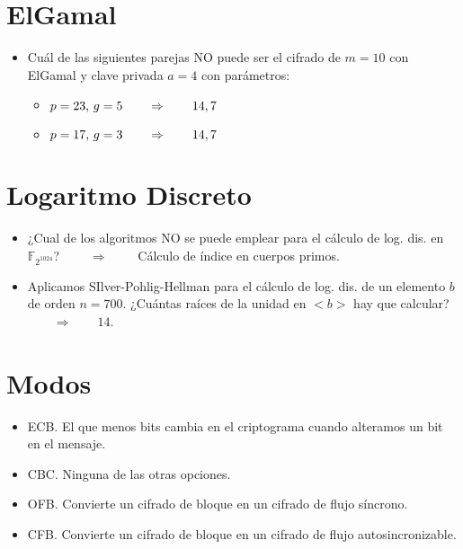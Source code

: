 \documentclass[fleqn]{article}
\def\F{\mathds{F}}
\def\next{\qquad \Rightarrow \qquad}
\begin{document}
    \section{ElGamal}
    \begin{itemize}
        \item Cuál de las siguientes parejas NO puede ser el cifrado de $m = 10$ con ElGamal y clave privada $a = 4$ con parámetros:
                \begin{itemize}
                    \item $p = 23, \thinspace g = 5 \next 14,7$
                    \item $p = 17, \thinspace g = 3 \next 14,7$
                \end{itemize}
    \end{itemize}

    \section{Logaritmo Discreto}
    \begin{itemize}
        \item ¿Cual de los algoritmos NO se puede emplear para el cálculo de log. dis. en $\F_{2^{1024}}$? $\next $ Cálculo de índice en cuerpos primos.
        \item Aplicamos SIlver-Pohlig-Hellman para el cálculo de log. dis. de un elemento $b$ de orden $n = 700$. ¿Cuántas raíces de la unidad en $<b>$ hay que calcular? $\next 14$.
    \end{itemize}

    \section{Modos}
    \begin{itemize}
        \item ECB. El que menos bits cambia en el criptograma cuando alteramos un bit en el mensaje.
        \item CBC. Ninguna de las otras opciones.
        \item OFB. Convierte un cifrado de bloque en un cifrado de flujo síncrono.
        \item CFB. Convierte un cifrado de bloque en un cifrado de flujo autosincronizable.
    \end{itemize}
\end{document}
